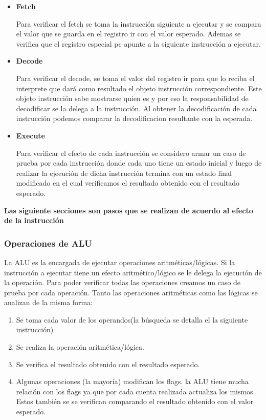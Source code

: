 \begin{itemize}
\item \textbf{Fetch} 

Para verificar el fetch se toma la instrucción siguiente a ejecutar y se compara el valor que se guarda en el registro ir con el valor esperado. Ademas se verifica que el registro especial pc apunte a la siguiente instrucción a ejecutar.

\item \textbf{Decode}

Para verificar el decode, se toma el valor del registro ir para que lo reciba el interprete que dará como resultado el objeto instrucción correspondiente. Este objeto instrucción sabe mostrarse quien es y por eso la responsabilidad de decodificar se la delega a la instrucción. Al obtener la decodificación de cada instrucción podemos comparar la decodificacion resultante con la esperada.
 
\item \textbf{Execute}

Para verificar el efecto de cada instrucción se considero armar un caso de prueba por cada instrucción donde cada uno tiene un estado inicial y luego de realizar la ejecución de dicha instrucción termina con un estado final modificado en el cual verificamos el resultado obtenido con el resultado esperado. 
\end{itemize}

\textbf{Las siguiente secciones son pasos que se realizan de acuerdo al efecto de la instrucción}
  
\subsubsection{Operaciones de ALU}

La ALU es la encargada de ejecutar operaciones aritméticas/lógicas. Si la instrucción a ejecutar tiene un efecto aritmético/lógico se le delega la ejecución de la operación. Para poder verificar todas las operaciones creamos un caso de prueba por cada operación. Tanto las operaciones aritméticas como las lógicas se analizan de la misma forma:

\begin{enumerate}
\item Se toma cada valor de los operandos(la búsqueda se detalla el la siguiente instrucción)

\item Se realiza la operación aritmética/lógica. 

\item Se verifica el resultado obtenido con el resultado esperado.

\item Algunas operaciones (la mayoría) modifican los flags. la ALU tiene mucha relación con los flags ya que por cada cuenta realizada actualiza los mismos. Estos también se se verifican comparando el resultado obtenido con el valor esperado. 
\end{enumerate}

